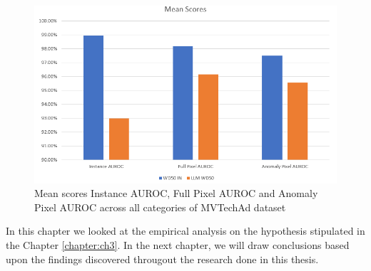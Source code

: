 \begin{figure}[h]
	\begin{center}
		\includegraphics[width=1.0\linewidth]{Chapter_4/llm_clip_mean.png}
	\end{center}
	\caption{Mean scores Instance AUROC, Full Pixel AUROC and Anomaly Pixel AUROC across all categories of MVTechAd dataset}
	\label{fig:llm_clip_mean}
\end{figure}

In this chapter we looked at the empirical analysis on the hypothesis stipulated in the Chapter \ref{chapter:ch3}. In the next chapter, we will draw conclusions based upon the findings discovered througout the research done in this thesis.